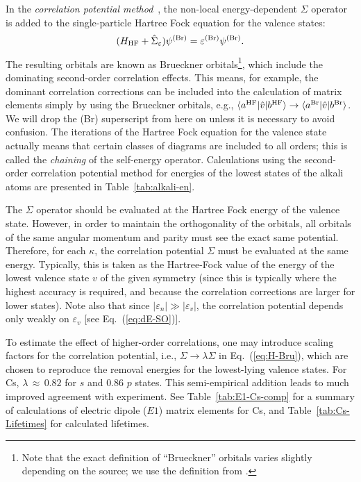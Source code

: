 \documentclass[10pt,twocolumn,a4paper]{article}%
\newcommand{\bra}[1]{\ensuremath{\langle #1|}}	%
\newcommand{\ket}[1]{\ensuremath{|#1\rangle}}	%
\newcommand{\be}{\begin{equation}}
\newcommand{\ee}{\end{equation}}
\def\en{\ensuremath{\varepsilon}}
\begin{document}
In the {\em correlation potential method}~\cite{DzubaPNC1984,DzubaPNC1985}, the non-local energy-dependent $\Sigma$ operator is added to the single-particle Hartree Fock equation for the valence states:
\be\label{eq:H-Bru}
(H_{\rm HF} + \hat \Sigma_\en)\psi^{\rm (Br)} = \en^{\rm (Br)}\psi^{\rm (Br)}.
\ee
The resulting orbitals are known as Brueckner orbitals\footnote{Note that the exact definition of ``Brueckner'' orbitals varies slightly depending on the source; we use the definition from \cite{DzubaPNC1984}.}, which include the dominating second-order correlation effects.
This means, for example, the dominant correlation corrections can be included into the calculation of matrix elements simply by using the Brueckner orbitals, e.g., $\bra{a^{\rm HF}}{\hat v}\ket{b^{\rm HF}}\to\bra{a^{\rm Br}}{\hat v}\ket{b^{\rm Br}}$.
We will drop the (Br) superscript from here on unless it is necessary to avoid confusion.
The iterations of the Hartree Fock equation for the valence state actually means that certain classes of diagrams are included to all orders; this is called the {\em chaining} of the self-energy operator.
Calculations using the second-order correlation potential method for energies of the lowest states of the alkali atoms are presented in Table~\ref{tab:alkali-en}.



The $\Sigma$ operator should be evaluated at the Hartree Fock energy of the valence state.
However, in order to maintain the orthogonality of the orbitals, all orbitals of the same angular momentum and parity must see the exact same potential.
Therefore, for each $\kappa$, the correlation potential $\Sigma$ must be evaluated at the same energy.
Typically, this is taken as the Hartree-Fock value of the energy of the lowest valence state $v$ of the given symmetry (since this is typically where the highest accuracy is required, and because the correlation corrections are larger for lower states).
Note also that since $|\en_n|\gg|\en_v|$, the correlation potential depends only weakly on $\en_v$ [see Eq.~(\ref{eq:dE-SO})].


To estimate the effect of higher-order correlations, one may introduce scaling factors for the correlation potential, i.e.,
$\Sigma\to\lambda\Sigma$ in Eq.~(\ref{eq:H-Bru}), which are chosen to reproduce the removal energies for the lowest-lying valence states.
For Cs, $\lambda$\,$\approx$\,$0.82$ for $s$ and $0.86$ $p$ states.
This semi-empirical addition leads to much improved agreement with experiment.
See Table~\ref{tab:E1-Cs-comp} for a summary of calculations of electric dipole ($E1$) matrix elements for Cs, and Table~\ref{tab:Cs-Lifetimes} for calculated lifetimes.
\end{document}
